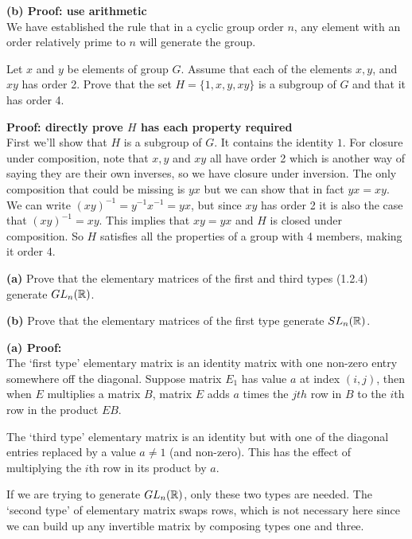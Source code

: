 \documentclass{article}
\begin{document}
\textbf{(b) Proof: use arithmetic}
\\

We have established the rule that in a cyclic group order $n$, any element with an order relatively prime to $n$ will generate the group.

\begin{problem}
Let $x$ and $y$ be elements of group $G$. Assume that each of the elements $x, y$, and $xy$ has order 2. Prove that the set $H = \{1, x, y, xy\}$ is a subgroup of $G$ and that it has order 4.
\end{problem}

\textbf{Proof: directly prove $H$ has each property required}
\\

First we'll show that $H$ is a subgroup of $G$. It contains the identity $1$. For closure under composition, note that $x, y$ and $xy$ all have order 2 which is another way of saying they are their own inverses, so we have closure under inversion. The only composition that could be missing is $yx$ but we can show that in fact $yx = xy$. We can write $(xy)^{-1} = y^{-1} x^{-1} = yx$, but since $xy$ has order 2 it is also the case that $(xy)^{-1} = xy$. This implies that $xy = yx$ and $H$ is closed under composition. So $H$ satisfies all the properties of a group with 4 members, making it order 4.

\begin{problem}
\textbf{(a)} Prove that the elementary matrices of the first and third types (1.2.4) generate $GL_n(\mathbb{R})$.

\textbf{(b)} Prove that the elementary matrices of the first type generate $SL_n(\mathbb{R})$.
\end{problem}
\textbf{(a) Proof: }
\\

The `first type' elementary matrix is an identity matrix with one non-zero entry somewhere off the diagonal. Suppose matrix $E_1$ has value $a$ at index $(i, j)$, then when $E$ multiplies a matrix $B$, matrix $E$ adds $a$ times the $jth$ row in $B$ to the $i$th row in the product $EB$.

The `third type' elementary matrix is an identity but with one of the diagonal entries replaced by a value $a \neq 1$ (and non-zero). This has the effect of multiplying the $i$th row in its product by $a$.

If we are trying to generate $GL_n(\mathbb{R})$, only these two types are needed. The `second type' of elementary matrix swaps rows, which is not necessary here since we can build up any invertible matrix by composing types one and three.
\end{document}
